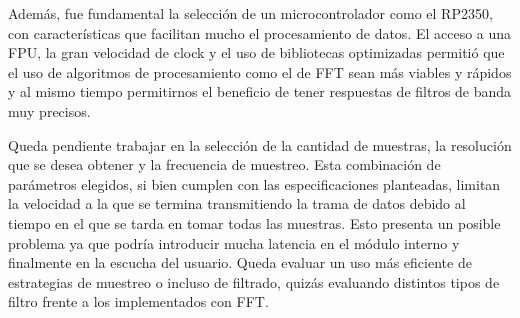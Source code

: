 \documentclass[conference]{IEEEtran}
\begin{document}
Además, fue fundamental la selección de un microcontrolador como el RP2350, con características que facilitan mucho el procesamiento de datos. El acceso a una FPU, la gran velocidad de clock y el uso de bibliotecas optimizadas permitió que el uso de algoritmos de procesamiento como el de FFT sean más viables y rápidos y al mismo tiempo permitirnos el beneficio de tener respuestas de filtros de banda muy precisos.

Queda pendiente trabajar en la selección de la cantidad de muestras, la resolución que se desea obtener y la frecuencia de muestreo. Esta combinación de parámetros elegidos, si bien cumplen con las especificaciones planteadas, limitan la velocidad a la que se termina transmitiendo la trama de datos debido al tiempo en el que se tarda en tomar todas las muestras. Esto presenta un posible problema ya que podría introducir mucha latencia en el módulo interno y finalmente en la escucha del usuario. Queda evaluar un uso más eficiente de estrategias de muestreo o incluso de filtrado, quizás evaluando distintos tipos de filtro frente a los implementados con FFT.



\nocite{*}
\balance
\end{document}
